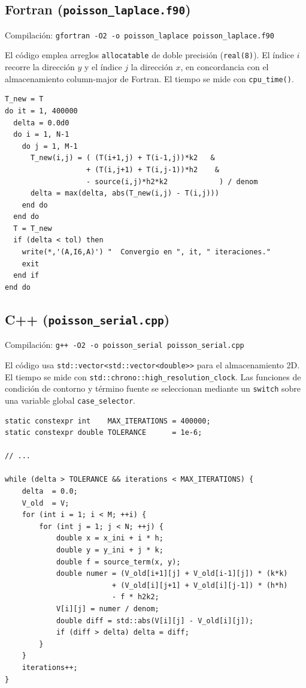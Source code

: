 \documentclass[12pt, a4paper]{article}
\begin{document}
\subsection{Fortran (\texttt{poisson\_laplace.f90})}

Compilación: \texttt{gfortran -O2 -o poisson\_laplace poisson\_laplace.f90}

El código emplea arreglos \texttt{allocatable} de doble precisión
(\texttt{real(8)}). El índice $i$ recorre la dirección $y$ y el índice $j$ la
dirección $x$, en concordancia con el almacenamiento column-major de Fortran.
El tiempo se mide con \texttt{cpu\_time()}.

\begin{lstlisting}[style=fortranstyle, caption={Núcleo de Jacobi en Fortran (Ejercicio 1).}]
T_new = T
do it = 1, 400000
  delta = 0.0d0
  do i = 1, N-1
    do j = 1, M-1
      T_new(i,j) = ( (T(i+1,j) + T(i-1,j))*k2   &
                   + (T(i,j+1) + T(i,j-1))*h2    &
                   - source(i,j)*h2*k2            ) / denom
      delta = max(delta, abs(T_new(i,j) - T(i,j)))
    end do
  end do
  T = T_new
  if (delta < tol) then
    write(*,'(A,I6,A)') "  Convergio en ", it, " iteraciones."
    exit
  end if
end do
\end{lstlisting}

\subsection{C++ (\texttt{poisson\_serial.cpp})}

Compilación: \texttt{g++ -O2 -o poisson\_serial poisson\_serial.cpp}

El código usa \texttt{std::vector<std::vector<double>>} para el almacenamiento
2D. El tiempo se mide con \texttt{std::chrono::high\_resolution\_clock}.
Las funciones de condición de contorno y término fuente se seleccionan
mediante un \texttt{switch} sobre una variable global \texttt{case\_selector}.

\begin{lstlisting}[style=cppstyle, caption={Núcleo de Jacobi en C++.}]
static constexpr int    MAX_ITERATIONS = 400000;
static constexpr double TOLERANCE      = 1e-6;

// ...

while (delta > TOLERANCE && iterations < MAX_ITERATIONS) {
    delta  = 0.0;
    V_old  = V;
    for (int i = 1; i < M; ++i) {
        for (int j = 1; j < N; ++j) {
            double x = x_ini + i * h;
            double y = y_ini + j * k;
            double f = source_term(x, y);
            double numer = (V_old[i+1][j] + V_old[i-1][j]) * (k*k)
                         + (V_old[i][j+1] + V_old[i][j-1]) * (h*h)
                         - f * h2k2;
            V[i][j] = numer / denom;
            double diff = std::abs(V[i][j] - V_old[i][j]);
            if (diff > delta) delta = diff;
        }
    }
    iterations++;
}
\end{lstlisting}
\end{document}
